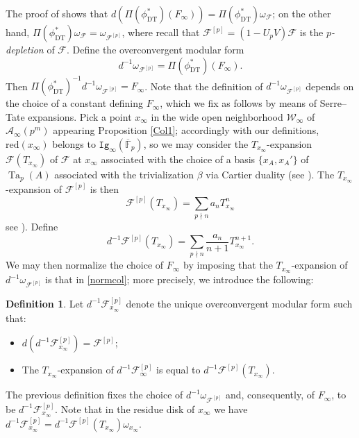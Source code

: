 \documentclass[a4paper,11pt]{amsart}
\numberwithin{equation}{section}
\theoremstyle{plain}
\theoremstyle{definition}
\newtheorem{definition}[theorem]{Definition}
\theoremstyle{remark}
\newcommand{\F}{\mathbb F}
\DeclareMathOperator{\Ta}{Ta}
\begin{document}
The proof of \cite[Theorem 10.1]{Coleman-Shimura} shows that 
 $d(\Pi(\phi_{\mathrm{DT}}^*)(F_\infty))=\Pi(\phi_{\mathrm{DT}}^*)\omega_\mathcal{F}$; on the other hand,  
 $\Pi(\phi_{\mathrm{DT}}^*)\omega_\mathcal{F}=\omega_{\mathcal{F}^{[p]}}$, where recall that $\mathcal{F}^{[p]}=(1-U_pV)\mathcal{F}$ is the \emph{$p$-depletion} of $\mathcal{F}$.  
Define the overconvergent modular form 
 \[d^{-1}\omega_{\mathcal{F}^{[p]}}=\Pi(\phi_{\mathrm{DT}}^*)(F_\infty).\] Then 
 $\Pi(\phi_{\mathrm{DT}}^*)^{-1}d^{-1} \omega_{\mathcal{F}^{[p]}}=F_\infty$. Note that the definition of $d^{-1}\omega_{\mathcal{F}^{[p]}}$ depends on the choice of a constant defining $F_\infty$, 
 which we fix as follows by means of Serre--Tate expansions.  
Pick a point $x_\infty$ in the wide open neighborhood ${\mathcal{W}}_\infty$ of $\mathcal{A}_\infty(p^m)$ appearing Proposition \ref{Col1}; accordingly with our definitions, 
$\mathrm{red}(x_\infty)$ belongs to $\texttt{Ig}_\infty(\overline{\F}_p)$, so we may consider the $T_{x_\infty}$-expansion 
$\mathcal{F}(T_{x_\infty})$ of $\mathcal{F}$ at $x_\infty$
associated with the choice of a basis 
$\{x_A,x_A'\}$ of $\Ta_p(A)$ associated with the trivialization $\beta$ via Cartier duality (see \cite[\S 3.1]{Magrone}).
The $T_{x_\infty}$-expansion of $\mathcal{F}^{[p]}$ is then
 \[\mathcal{F}^{[p]}(T_{x_\infty})=\sum_{p\nmid n}a_nT_{x_\infty}^n\] 
 {see \cite[Lemma 5.2]{Burungale}).} Define 
 \begin{equation}\label{normcol}
 d^{-1}\mathcal{F}^{[p]}(T_{x_\infty})=\sum_{p\nmid n}\frac{a_n}{n+1}T_{x_\infty}^{n+1}.\end{equation}
We may then normalize the choice of $F_\infty$ by imposing that the $T_{x_\infty}$-expansion of  $d^{-1}\omega_{\mathcal{F}^{[p]}}$ is that in \eqref{normcol}; more precisely, we introduce the following: 
 \begin{definition}\label{def9.6} Let $d^{-1}\mathcal{F}^{[p]}_{x_\infty}$ denote the unique overconvergent modular form such that:
 \begin{itemize} 
 \item $d(d^{-1}\mathcal{F}^{[p]}_{x_\infty})=\mathcal{F}^{[p]}$; 
 \item The $T_{x_\infty}$-expansion of $d^{-1}\mathcal{F}^{[p]}_{\infty}$ is equal to $d^{-1}\mathcal{F}^{[p]}(T_{x_{\infty}})$.\end{itemize}
 \end{definition}
 
The previous definition fixes the choice of $d^{-1}\omega_{\mathcal{F}^{[p]}}$ and, consequently, of $F_\infty$, to be $d^{-1}\mathcal{F}^{[p]}_{x_\infty}$. 
Note that in the residue disk of $x_\infty$ we have 
 $d^{-1}\mathcal{F}^{[p]}_{x_\infty}=d^{-1}\mathcal{F}^{[p]}(T_{x_\infty})\omega_{x_\infty}$. 
 
\end{document}
